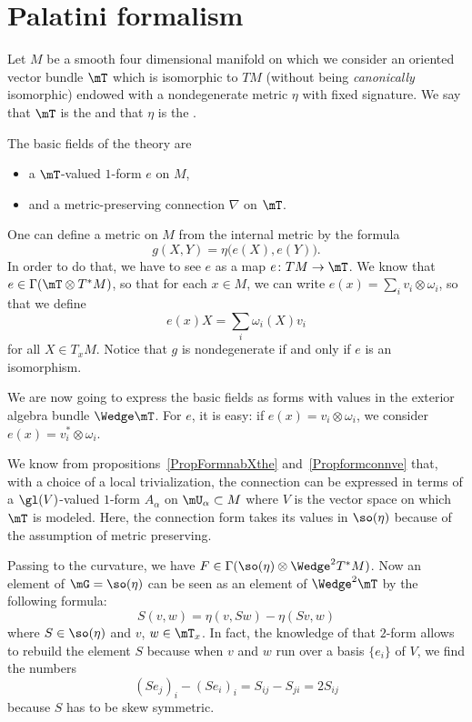 \section{Palatini formalism}

Let $M$ be a smooth four dimensional manifold on which we consider an oriented vector bundle $\mT$ which is isomorphic to $TM$ (without being \emph{canonically} isomorphic) endowed with a nondegenerate metric $\eta$ with fixed signature. We say that $\mT$ is the  and that $\eta$ is the .

The basic fields of the theory are
\begin{itemize}
\item a $\mT$-valued $1$-form $e$ on $M$,
\item and a metric-preserving connection $\nabla$ on $\mT$.
\end{itemize}
One can define a metric on $M$ from the internal metric by the formula
\begin{equation}
  g(X,Y)=\eta\big( e(X),e(Y) \big).
\end{equation}
In order to do that, we have to see $e$ as a map $e\colon TM\to \mT$. We know that $e\in\Gamma(\mT\otimes T^*M)$, so that for each $x\in M$, we can write $e(x)=\sum_iv_i\otimes\omega_i$, so that we define
\[
  e(x)X=\sum_i\omega_i(X)v_i
\]
for all $X\in T_xM$. Notice that $g$ is nondegenerate if and only if $e$ is an isomorphism.

We are now going to express the basic fields as forms with values in the exterior algebra bundle $\Wedge\mT$. For $e$, it is easy: if $e(x)=v_i\otimes \omega_i$, we consider $e(x)=v_i^*\otimes\omega_i$.

We know from propositions~\ref{PropFormnabXthe} and~\ref{Propformconnve} that, with a choice of a local trivialization, the connection can be expressed in terms of a $\gl(V)$-valued $1$-form $A_{\alpha}$ on $\mU_{\alpha}\subset M$ where $V$ is the vector space on which $\mT$ is modeled. Here, the connection form takes its values in $\so(\eta)$ because of the assumption of metric preserving.

Passing to the curvature, we have $F\in\Gamma(\so(\eta)\otimes\Wedge^2T^*M)$. Now an element of $\mG=\so(\eta)$ can be seen as an element of $\Wedge^2\mT$ by the following formula:
\begin{equation}
S(v,w)=\eta(v,Sw)-\eta(Sv,w)
\end{equation}
where $S\in\so(\eta)$ and $v$, $w\in \mT_x$. In fact, the knowledge of that $2$-form allows to rebuild the element $S$ because when $v$ and $w$ run over a basis $\{ e_i \}$ of $V$, we find the numbers
\[
  (Se_j)_{i}-(Se_i)_i=S_{ij}-S_{ji}=2S_{ij}
\]
because $S$ has to be skew symmetric.

